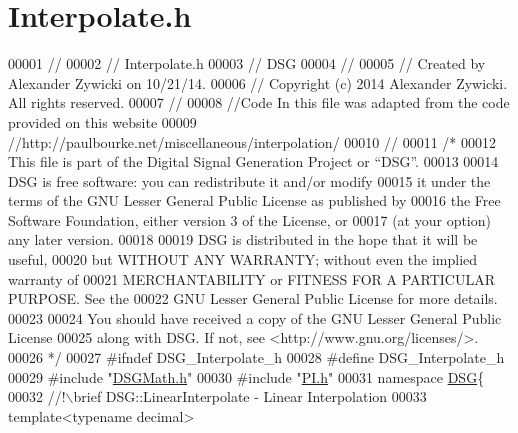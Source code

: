 \hypertarget{_interpolate_8h_source}{\section{Interpolate.\+h}
\label{_interpolate_8h_source}
}

\begin{DoxyCode}
00001 \textcolor{comment}{//}
00002 \textcolor{comment}{//  Interpolate.h}
00003 \textcolor{comment}{//  DSG}
00004 \textcolor{comment}{//}
00005 \textcolor{comment}{//  Created by Alexander Zywicki on 10/21/14.}
00006 \textcolor{comment}{//  Copyright (c) 2014 Alexander Zywicki. All rights reserved.}
00007 \textcolor{comment}{//}
00008 \textcolor{comment}{//Code In this file was adapted from the code provided on this website}
00009 \textcolor{comment}{//http://paulbourke.net/miscellaneous/interpolation/}
00010 \textcolor{comment}{//}
00011 \textcolor{comment}{/*}
00012 \textcolor{comment}{ This file is part of the Digital Signal Generation Project or “DSG”.}
00013 \textcolor{comment}{}
00014 \textcolor{comment}{ DSG is free software: you can redistribute it and/or modify}
00015 \textcolor{comment}{ it under the terms of the GNU Lesser General Public License as published by}
00016 \textcolor{comment}{ the Free Software Foundation, either version 3 of the License, or}
00017 \textcolor{comment}{ (at your option) any later version.}
00018 \textcolor{comment}{}
00019 \textcolor{comment}{ DSG is distributed in the hope that it will be useful,}
00020 \textcolor{comment}{ but WITHOUT ANY WARRANTY; without even the implied warranty of}
00021 \textcolor{comment}{ MERCHANTABILITY or FITNESS FOR A PARTICULAR PURPOSE.  See the}
00022 \textcolor{comment}{ GNU Lesser General Public License for more details.}
00023 \textcolor{comment}{}
00024 \textcolor{comment}{ You should have received a copy of the GNU Lesser General Public License}
00025 \textcolor{comment}{ along with DSG.  If not, see <http://www.gnu.org/licenses/>.}
00026 \textcolor{comment}{ */}
00027 \textcolor{preprocessor}{#ifndef DSG\_Interpolate\_h}
00028 \textcolor{preprocessor}{#define DSG\_Interpolate\_h}
00029 \textcolor{preprocessor}{#include "\hyperlink{_d_s_g_math_8h}{DSGMath.h}"}
00030 \textcolor{preprocessor}{#include "\hyperlink{_p_i_8h}{PI.h}"}
00031 \textcolor{keyword}{namespace }\hyperlink{namespace_d_s_g}{DSG}\{\textcolor{comment}{}
00032 \textcolor{comment}{    //!\(\backslash\)brief DSG::LinearInterpolate - Linear Interpolation}
00033 \textcolor{comment}{}    \textcolor{keyword}{template}<\textcolor{keyword}{typename} decimal>

\end{DoxyCode}
